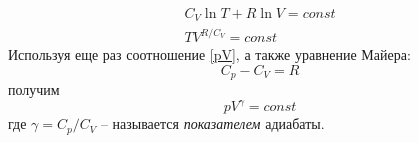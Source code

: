 \documentclass[a4paper,12pt]{article}
\begin{document}
        \begin{eqnarray}
            C_V\ln T+R\ln V=const\\ 
            TV^{R/C_V}=const
        \end{eqnarray}
        Используя еще раз соотношение \eqref{pV}, а также уравнение Майера:
        \begin{equation}
            \label{Mayer}
            C_p-C_V=R
        \end{equation}
        получим
        \begin{equation}
            \label{final gamma}
            pV^\gamma=const
        \end{equation}
        где $\gamma=C_p/C_V$ -- называется \emph{показателем} адиабаты. 
\end{document}
